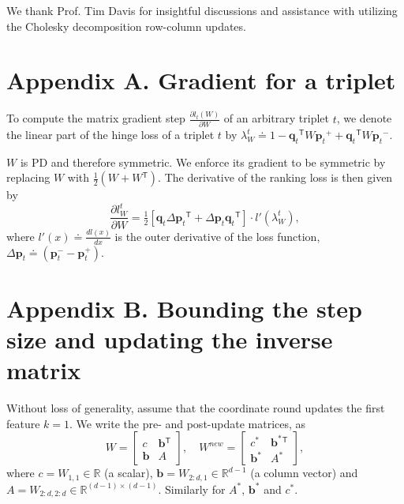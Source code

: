 \documentclass[twoside,11pt]{article}
\newcommand\mat[1]{{#1}}
\renewcommand\vec[1]{\mathbf{#1}}
\newcommand{\T}{{}^\mathsf{T}}
\newcommand{\W}{\mat{W}}
\newcommand{\newW}{{\mat{W^{new}}}}
\newcommand{\eqdef}{\doteq}
\newcommand{\R}{\mathbb{R}}
\newcommand{\q}{{\vec{q}}}
\newcommand{\p}{{\vec{p}}}
\newcommand{\trip}{{t}}
\newcommand{\qt}{{\q_{\trip}}}
\newcommand{\pt}{{\p_{\trip}}}
\newcommand{\B}{\vec{b}}
\newcommand{\C}{c}
\newcommand{\Wvec}{\W_{2:d,1}}
\newcommand{\Wscalar}{\W_{1,1}}
\begin{document}
 We thank Prof. Tim Davis for insightful discussions and assistance with utilizing the Cholesky decomposition row-column updates.

\newpage

\appendix
\section*{Appendix A. Gradient for a triplet}
\label{appendix-grad}
To compute the matrix gradient step $\frac{\partial {l_t (\W)}}{\partial \W}$ of an arbitrary triplet $t$, we denote the linear part of the hinge loss of a triplet $t$ by $\lambda_{W}^t \eqdef 
1-\qt\T \W \pt^{+} + \qt\T\W\pt^{-}.$

$\W$ is PD and therefore symmetric. We enforce its gradient to be symmetric by replacing $\W$ with $\tfrac{1}{2}(\W + \W\T)$. The derivative of the ranking loss is then given by
\begin{equation}
  \frac{\partial {l_{\W}^{t}}}{\partial \W} = \tfrac{1}{2}[\vec{q}_{t}\Delta\vec{p}_{t}\T  + \Delta\vec{p}_{t}\vec{q}_{t}\T]\cdot {l'}(\lambda_{W}^t),
  \label{dlossranking} \nonumber 
\end{equation}
where $l'(x) \eqdef \frac{d{l(x)}}{dx}$ is the outer derivative of the loss function, $\Delta\vec{p}_{t} \eqdef (\vec{p}_{t}^{-} - \vec{p}_{t}^{+})$.

\section*{Appendix B. Bounding the step size and updating the inverse matrix}
\label{appendix-inverse}
Without loss of generality, assume that the coordinate round updates the first feature $k = 1$. We write the pre- and post-update matrices, as
\begin{equation}
  \W = \left[ \begin{matrix} \C & \B\T \\ \B & A \end{matrix} \right],
  \quad
  \newW = \left[ \begin{matrix} \C^* & \B^*\T \\ \B^* & A^* \end{matrix} \right],
  \label{schurNotationPreUpdate}
\end{equation}
 where $\C = \Wscalar \in \R$ (a scalar), $\B = \Wvec \in \R^{d-1}$ (a column vector) and $A = \W_{2:d,2:d} \in \R^{(d-1) \times (d-1)}$. Similarly for $A^*$, $\B^*$ and $\C^*$.
\end{document}
